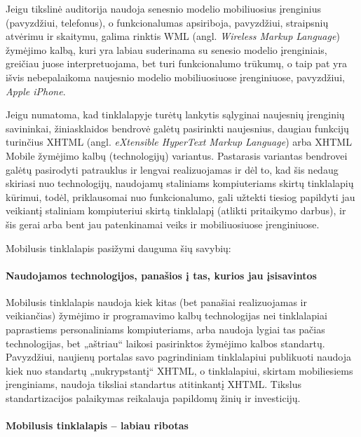 \documentclass[kursinis-darbas]{vukf}
\begin{document}
Jeigu tikslinė auditorija naudoja senesnio modelio mobiliuosius įrenginius (pavyzdžiui, telefonus), o funkcionalumas apsiriboja, pavyzdžiui, straipsnių atvėrimu ir skaitymu, galima rinktis WML (angl. \emph{Wireless Markup Language}) žymėjimo kalbą, kuri yra labiau suderinama su senesio modelio įrenginiais, greičiau juose interpretuojama, bet turi funkcionalumo trūkumų, o taip pat yra išvis nebepalaikoma naujesnio modelio mobiliuosiuose įrenginiuose, pavyzdžiui, \emph{Apple iPhone}.

Jeigu numatoma, kad tinklalapyje turėtų lankytis sąlyginai naujesnių įrenginių savininkai, žiniasklaidos bendrovė galėtų pasirinkti naujesnius, daugiau funkcijų turinčius XHTML (angl. \emph{eXtensible HyperText Markup Language}) arba XHTML Mobile žymėjimo kalbų (technologijų) variantus. Pastarasis variantas bendrovei galėtų pasirodyti patrauklus ir lengvai realizuojamas ir dėl to, kad šis nedaug skiriasi nuo technologijų, naudojamų staliniams kompiuteriams skirtų tinklalapių kūrimui, todėl, priklausomai nuo funkcionalumo, gali užtekti tiesiog papildyti jau veikiantį staliniam kompiuteriui skirtą tinklalapį (atlikti pritaikymo darbus), ir šis gerai arba bent jau patenkinamai veiks ir mobiliuosiuose įrenginiuose.

Mobilusis tinklalapis pasižymi dauguma šių savybių:

\paragraph{Naudojamos technologijos, panašios į tas, kurios jau įsisavintos}

Mobilusis tinklalapis naudoja kiek kitas (bet panašiai realizuojamas ir veikiančias) žymėjimo ir programavimo kalbų technologijas nei tinklalapiai paprastiems personaliniams kompiuteriams, arba naudoja lygiai tas pačias technologijas, bet „aštriau“ laikosi pasirinktos žymėjimo kalbos standartų. Pavyzdžiui, naujienų portalas savo pagrindiniam tinklalapiui publikuoti naudoja kiek nuo standartų „nukrypstantį“ XHTML, o tinklalapiui, skirtam mobiliesiems įrenginiams, naudoja tiksliai standartus atitinkantį XHTML. Tikslus standartizacijos palaikymas reikalauja papildomų žinių ir investicijų.

\paragraph{Mobilusis tinklalapis – labiau ribotas}
\end{document}
